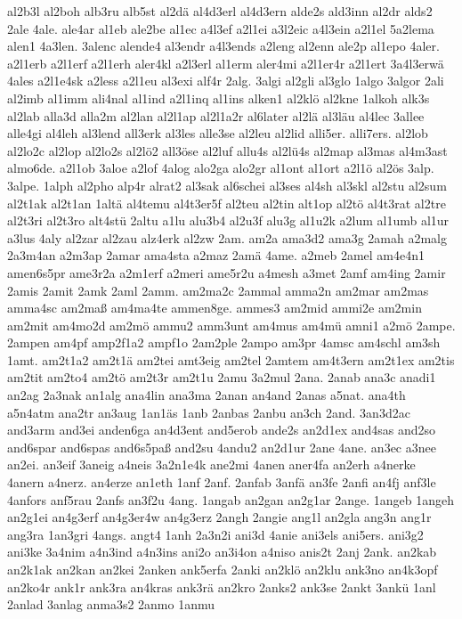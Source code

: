 {al2b3l
al2boh
alb3ru
alb5st
al2dä
al4d3erl
al4d3ern
alde2s
ald3inn
al2dr
alds2
2ale
4ale.
ale4ar
al1eb
ale2be
al1ec
a4l3ef
a2l1ei
a3l2eic
a4l3ein
a2l1el
5a2lema
alen1
4a3len.
3alenc
alende4
al3endr
a4l3ends
a2leng
al2enn
ale2p
al1epo
4aler.
a2l1erb
a2l1erf
a2l1erh
aler4kl
a2l3erl
al1erm
aler4mi
a2l1er4r
a2l1ert
3a4l3erwä
4ales
a2l1e4sk
a2less
a2l1eu
al3exi
alf4r
2alg.
3algi
al2gli
al3glo
1algo
3algor
2ali
al2imb
al1imm
ali4nal
al1ind
a2l1inq
al1ins
alken1
al2klö
al2kne
1alkoh
alk3s
al2lab
alla3d
alla2m
al2lan
al2l1ap
al2l1a2r
al6later
al2lä
al3läu
al4lec
3allee
alle4gi
al4leh
al3lend
all3erk
al3les
alle3se
al2leu
al2lid
alli5er.
alli7ers.
al2lob
al2lo2c
al2lop
al2lo2s
al2lö2
all3öse
al2luf
allu4s
al2lü4s
al2map
al3mas
al4m3ast
almo6de.
a2l1ob
3aloe
a2lof
4alog
alo2ga
alo2gr
al1ont
al1ort
a2l1ö
al2ös
3alp.
3alpe.
1alph
al2pho
alp4r
alrat2
al3sak
al6schei
al3ses
al4sh
al3skl
al2stu
al2sum
al2t1ak
al2t1an
1altä
al4temu
al4t3er5f
al2teu
al2tin
alt1op
al2tö
al4t3rat
al2tre
al2t3ri
al2t3ro
alt4stü
2altu
a1lu
alu3b4
al2u3f
alu3g
al1u2k
a2lum
al1umb
al1ur
a3lus
4aly
al2zar
al2zau
alz4erk
al2zw
2am.
am2a
ama3d2
ama3g
2amah
a2malg
2a3m4an
a2m3ap
2amar
ama4sta
a2maz
2amä
4ame.
a2meb
2amel
am4e4n1
amen6s5pr
ame3r2a
a2m1erf
a2meri
ame5r2u
a4mesh
a3met
2amf
am4ing
2amir
2amis
2amit
2amk
2aml
2amm.
am2ma2c
2ammal
amma2n
am2mar
am2mas
amma4sc
am2maß
am4ma4te
ammen8ge.
ammes3
am2mid
ammi2e
am2min
am2mit
am4mo2d
am2mö
ammu2
amm3unt
am4mus
am4mü
amni1
a2mö
2ampe.
2ampen
am4pf
amp2f1a2
ampf1o
2am2ple
2ampo
am3pr
4amsc
am4schl
am3sh
1amt.
am2t1a2
am2t1ä
am2tei
amt3eig
am2tel
2amtem
am4t3ern
am2t1ex
am2tis
am2tit
am2to4
am2tö
am2t3r
am2t1u
2amu
3a2mul
2ana.
2anab
ana3c
anadi1
an2ag
2a3nak
an1alg
ana4lin
ana3ma
2anan
an4and
2anas
a5nat.
ana4th
a5n4atm
ana2tr
an3aug
1an1äs
1anb
2anbas
2anbu
an3ch
2and.
3an3d2ac
and3arm
and3ei
anden6ga
an4d3ent
and5erob
ande2s
an2d1ex
and4sas
and2so
and6spar
and6spas
and6s5paß
and2su
4andu2
an2d1ur
2ane
4ane.
an3ec
a3nee
an2ei.
an3eif
3aneig
a4neis
3a2n1e4k
ane2mi
4anen
aner4fa
an2erh
a4nerke
4anern
a4nerz.
an4erze
an1eth
1anf
2anf.
2anfab
3anfä
an3fe
2anfi
an4fj
anf3le
4anfors
anf5rau
2anfs
an3f2u
4ang.
1angab
an2gan
an2g1ar
2ange.
1angeb
1angeh
an2g1ei
an4g3erf
an4g3er4w
an4g3erz
2angh
2angie
ang1l
an2gla
ang3n
ang1r
ang3ra
1an3gri
4angs.
angt4
1anh
2a3n2i
ani3d
4anie
ani3els
ani5ers.
ani3g2
ani3ke
3a4nim
a4n3ind
a4n3ins
ani2o
an3i4on
a4niso
anis2t
2anj
2ank.
an2kab
an2k1ak
an2kan
an2kei
2anken
ank5erfa
2anki
an2klö
an2klu
ank3no
an4k3opf
an2ko4r
ank1r
ank3ra
an4kras
ank3rä
an2kro
2anks2
ank3se
2ankt
3ankü
1anl
2anlad
3anlag
anma3s2
2anmo
1anmu
}

